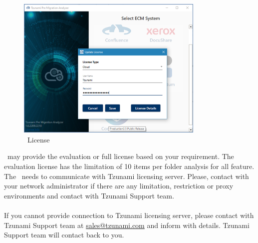 \begin{figure} 
  \centering
	\includegraphics[width=0.8\textwidth]{Images/SelectEcmImage.png}
 \caption{\appName\ License}
\end{figure}
\compName\ may provide the evaluation or full license based on your requirement. The evaluation license has the limitation of 10 items per folder analysis for all feature.
The \appName\ needs to communicate with Tzunami licensing server. Please, contact with your network administrator if there are any limitation, restriction or proxy environments and contact with Tzunami Support team. \\\\
If you cannot provide connection to Tzunami licensing server, please contact with Tzunami Support team at \href{mailto: sales@tzunami.com}{sales@tzunami.com} and inform with details. Tzunami Support team will contact back to you.
